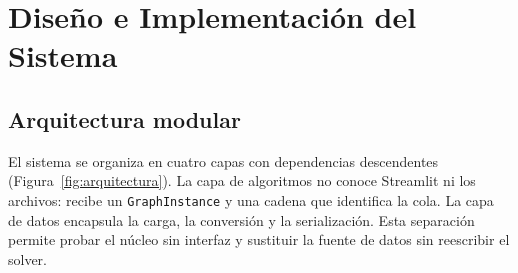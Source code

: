 \section{Diseño e Implementación del Sistema}
\label{sec:implementacion}

\subsection{Arquitectura modular}
El sistema se organiza en cuatro capas con dependencias descendentes (Figura~\ref{fig:arquitectura}). La capa de algoritmos no conoce Streamlit ni los archivos: recibe un \texttt{GraphInstance} y una cadena que identifica la cola. La capa de datos encapsula la carga, la conversión y la serialización. Esta separación permite probar el núcleo sin interfaz y sustituir la fuente de datos sin reescribir el solver.

